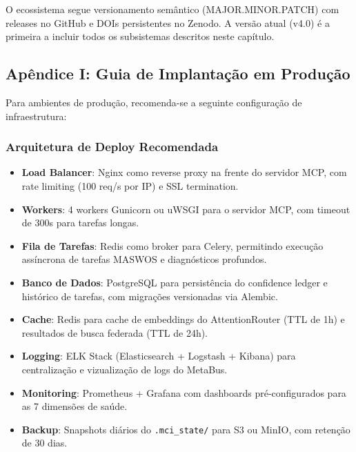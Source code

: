 O ecossistema segue versionamento semântico (MAJOR.MINOR.PATCH) com releases no GitHub e DOIs persistentes no Zenodo. A versão atual (v4.0) é a primeira a incluir todos os subsistemas descritos neste capítulo.


\subsection{Apêndice I: Guia de Implantação em Produção}
\label{sec:apendice-producao}

Para ambientes de produção, recomenda-se a seguinte configuração de infraestrutura:

\subsubsection{Arquitetura de Deploy Recomendada}

\begin{itemize}
  \item \textbf{Load Balancer}: Nginx como reverse proxy na frente do servidor MCP, com rate limiting (100 req/s por IP) e SSL termination.
  \item \textbf{Workers}: 4 workers Gunicorn ou uWSGI para o servidor MCP, com timeout de 300s para tarefas longas.
  \item \textbf{Fila de Tarefas}: Redis como broker para Celery, permitindo execução assíncrona de tarefas MASWOS e diagnósticos profundos.
  \item \textbf{Banco de Dados}: PostgreSQL para persistência do confidence ledger e histórico de tarefas, com migrações versionadas via Alembic.
  \item \textbf{Cache}: Redis para cache de embeddings do AttentionRouter (TTL de 1h) e resultados de busca federada (TTL de 24h).
  \item \textbf{Logging}: ELK Stack (Elasticsearch + Logstash + Kibana) para centralização e vizualização de logs do MetaBus.
  \item \textbf{Monitoring}: Prometheus + Grafana com dashboards pré-configurados para as 7 dimensões de saúde.
  \item \textbf{Backup}: Snapshots diários do \texttt{.mci\_state/} para S3 ou MinIO, com retenção de 30 dias.
\end{itemize}

